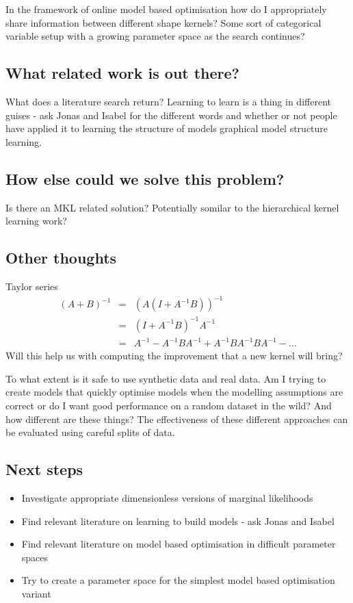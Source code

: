 \documentclass[twoside,11pt]{article}
\begin{document}
In the framework of online model based optimisation how do I appropriately share information between different shape kernels?
Some sort of categorical variable setup with a growing parameter space as the search continues?

\subsection{What related work is out there?}

What does a literature search return?
Learning to learn is a thing in different guises - ask Jonas and Isabel for the different words and whether or not people have applied it to learning the structure of models \eg graphical model structure learning.

\subsection{How else could we solve this problem?}

Is there an MKL related solution?
Potentially somilar to the hierarchical kernel learning work?

\subsection{Other thoughts}

Taylor series \eg
\begin{eqnarray}
  (A+B)^{-1} & = & (A(I+A^{-1}B))^{-1} \\
             & = & (I + A^{-1}B)^{-1}A^{-1} \\
             & = & A^{-1} - A^{-1}BA^{-1} + A^{-1}BA^{-1}BA^{-1} - \dots
\end{eqnarray}
Will this help us with computing the improvement that a new kernel will bring?

To what extent is it safe to use synthetic data and real data.
Am I trying to create models that quickly optimise models when the modelling assumptions are correct or do I want good performance on a random dataset in the wild?
And how different are these things?
The effectiveness of these different approaches can be evaluated using careful splits of data.

\subsection{Next steps}

\begin{itemize}
   \item Investigate appropriate dimensionless versions of marginal likelihoods
   \item Find relevant literature on learning to build models - ask Jonas and Isabel
   \item Find relevant literature on model based optimisation in difficult parameter spaces
   \item Try to create a parameter space for the simplest model based optimisation variant
\end{itemize}
\end{document}
